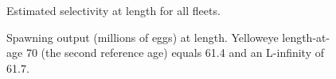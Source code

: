 \documentclass[
]{scrartcl}
\begin{document}
\clearpage

\begin{figure}


\caption{\label{fig-selex_allfleets}Estimated selectivity at length for
all fleets.}

\end{figure}%

\begin{figure}


\caption{\label{fig-spoutlen}Spawning output (millions of eggs) at
length. Yelloweye length-at-age 70 (the second reference age) equals
61.4 and an L-infinity of 61.7.}

\end{figure}%
\end{document}
